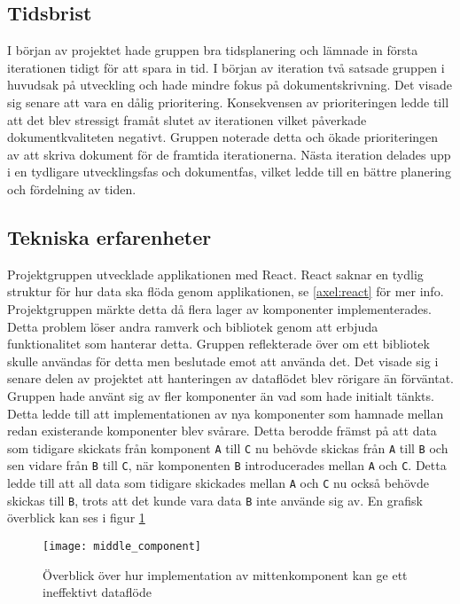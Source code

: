 \subsection{Tidsbrist}
I början av projektet hade gruppen bra tidsplanering och lämnade in första iterationen tidigt för att spara in tid. I början av iteration två satsade gruppen i huvudsak på utveckling och hade mindre fokus på dokumentskrivning. Det visade sig senare att vara en dålig prioritering. Konsekvensen av prioriteringen ledde till att det blev stressigt framåt slutet av iterationen vilket påverkade dokumentkvaliteten negativt. Gruppen noterade detta och ökade prioriteringen av att skriva dokument för de framtida iterationerna. Nästa iteration delades upp i en tydligare utvecklingsfas och dokumentfas, vilket ledde till en bättre planering och fördelning av tiden.

\subsection{Tekniska erfarenheter}
Projektgruppen utvecklade applikationen med React. React saknar en tydlig struktur för hur data ska flöda genom applikationen, se \ref{axel:react} för mer info. Projektgruppen märkte detta då flera lager av komponenter implementerades. Detta problem löser andra ramverk och bibliotek genom att erbjuda funktionalitet som hanterar detta. Gruppen reflekterade över om ett bibliotek skulle användas för detta men beslutade emot att använda det. Det visade sig i senare delen av projektet att hanteringen av dataflödet blev rörigare än förväntat. Gruppen hade använt sig av fler komponenter än vad som hade initialt tänkts. Detta ledde till att implementationen av nya komponenter som hamnade mellan redan existerande komponenter blev svårare. Detta berodde främst på att data som tidigare skickats från komponent \texttt{A} till \texttt{C} nu behövde skickas från \texttt{A} till \texttt{B} och sen vidare från \texttt{B} till \texttt{C}, när komponenten \texttt{B} introducerades mellan \texttt{A} och \texttt{C}. Detta ledde till att all data som tidigare skickades mellan \texttt{A} och \texttt{C} nu också behövde skickas till \texttt{B}, trots att det kunde vara data \texttt{B} inte använde sig av. En grafisk överblick kan ses i figur \ref{fig:middle_component}

\begin{figure}[H]
    \centering
    \texttt{[image: middle\_component]}
    \caption{Överblick över hur implementation av mittenkomponent kan ge ett ineffektivt dataflöde}
    \label{fig:middle_component}
\end{figure}

